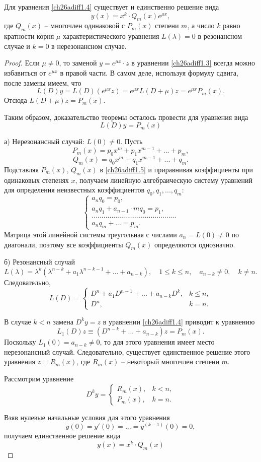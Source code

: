 \begin{thm} 
Для уравнения \eqref{ch26adiff1.4} существует и единственно решение вида
$$
y(x)=x^k\cdot Q_m(x)e^{\mu x},
$$
где $Q_m(x)$ -- многочлен одинаковой с $P_m(x)$ степени $m$, а число $k$ равно кратности корня $\mu$ характеристического уравнения $L(\lambda)=0$ в резонансном случае и $k=0$ в нерезонансном случае.
\end{thm}

\begin{proof}
Если $\mu\neq 0$, то заменой $y=e^{\mu x}\cdot z$ в уравнении \eqref{ch26adiff1.3} всегда можно избавиться от $e^{\mu x}$ в правой части. В самом деле,  используя формулу сдвига, после замены имеем, что
$$
L(D)y=L(D)(e^{\mu x}z)=e^{\mu x}L(D+\mu)z=e^{\mu x}P_m(x).
$$
Отсюда $L(D+\mu)z=P_m(x)$.

Таким образом, доказательство теоремы осталось провести для уравнения вида
\begin{equation}\label{ch26adiff1.5}
L(D)y=P_m(x)
\end{equation}

а) Нерезонансный случай: $L(0)\neq 0$. Пусть
$$
P_m(x)=p_0x^m+p_1x^{m-1}+...+p_m,
$$
$$
Q_m(x)=q_0x^m+q_1x^{m-1}+...+q_m.
$$
Подставляя $P_m(x)$, $Q_m(x)$ в \eqref{ch26adiff1.5} и приравнивая коэффициенты при одинаковых степенях $x$, получаем линейную алгебраическую систему уравнений для  определения неизвестных коэффициентов $q_0,q_1,...,q_m$:
$$
\begin{cases}
a_nq_0=p_0,\\
a_nq_1+a_{n-1}\cdot m q_0=p_1,\\
...........................................\\
a_nq_m+...=p_m.
\end{cases}
$$
Матрица этой линейной системы треугольная с числами $a_n=L(0)\neq 0$ по диагонали, поэтому все коэффициенты $Q_m(x)$ определяются однозначно.

б) Резонансный случай
$$
L(\lambda)=\lambda^k(\lambda^{n-k}+a_1\lambda^{n-k-1}+...+a_{n-k}),\quad 1\leq k \leq n,\quad a_{n-k}\neq 0,\quad k\neq n.
$$
Следовательно,
$$
L(D)=\begin{cases}
D^n+a_1D^{n-1}+...+a_{n-k}D^k, &k\le n,\\
D^n, &k=n.
\end{cases}
$$

В случае $k<n$ замена $D^ky=z$ в уравнении \eqref{ch26adiff1.4} приводит к уравнению
$$
L_1(D)z\equiv (D^{n-k}+...+a_{n-k})z=P_m(x).
$$
Поскольку $L_1(0)=a_{n-k}\neq 0$, то для этого уравнения имеет место нерезонансный случай. Следовательно, существует единственное решение этого уравнения $z=R_m(x)$, где $R_m(x)$ -- некоторый многочлен степени $m$.


Рассмотрим уравнение
$$
D^ky=\begin{cases}
R_m(x), &k<n,\\
P_m(x), &k=n.
\end{cases}
$$

Взяв нулевые начальные условия для этого уравнения
$$
y(0)=y'(0)=...=y^{(k-1)}(0)=0,
$$
получаем единственное решение вида
$$
y(x)=x^k\cdot Q_m(x)
$$
\end{proof}
